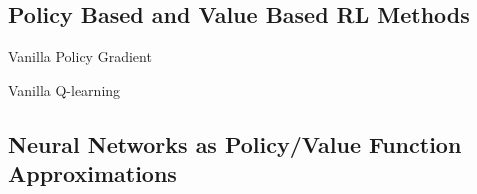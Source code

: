 
\subsection{Policy Based and Value Based RL Methods}
Vanilla Policy Gradient

Vanilla Q-learning

\subsection{Neural Networks as Policy/Value Function Approximations}
\label{subsec:nn_value_policy}
 



